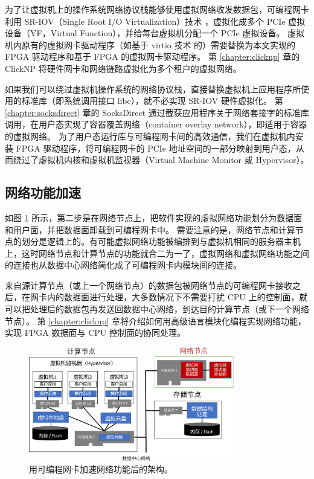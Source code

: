 为了让虚拟机上的操作系统网络协议栈能够使用虚拟网络收发数据包，可编程网卡利用 SR-IOV（Single Root I/O Virtualization）技术 \cite{dong2012high}，虚拟化成多个 PCIe 虚拟设备（VF，Virtual Function），并给每台虚拟机分配一个 PCIe 虚拟设备。
虚拟机内原有的虚拟网卡驱动程序（如基于 virtio 技术 \cite{russell2008virtio} 的）需要替换为本文实现的 FPGA 驱动程序和基于 FPGA 的虚拟网卡驱动程序。
第 \ref{chapter:clicknp} 章的 ClickNP 将硬件网卡和网络链路虚拟化为多个租户的虚拟网络。

如果我们可以绕过虚拟机操作系统的网络协议栈，直接替换虚拟机上应用程序所使用的标准库（即系统调用接口 libc），就不必实现 SR-IOV 硬件虚拟化。
第 \ref{chapter:socksdirect} 章的 SocksDirect 通过截获应用程序关于网络套接字的标准库调用，在用户态实现了容器覆盖网络（container overlay network），即适用于容器的虚拟网络。
为了用户态运行库与可编程网卡间的高效通信，我们在虚拟机内安装 FPGA 驱动程序，将可编程网卡的 PCIe 地址空间的一部分映射到用户态，从而绕过了虚拟机内核和虚拟机监视器（Virtual Machine Monitor 或 Hypervisor）。



\subsection{网络功能加速}

如图 \ref{arch:fig:network-function} 所示，第二步是在网络节点上，把软件实现的虚拟网络功能划分为数据面和用户面，并把数据面卸载到可编程网卡中。
需要注意的是，网络节点和计算节点的划分是逻辑上的。有可能虚拟网络功能被编排到与虚拟机相同的服务器主机上，这时网络节点和计算节点的功能就合二为一了，虚拟网络和虚拟网络功能之间的连接也从数据中心网络简化成了可编程网卡内模块间的连接。

来自源计算节点（或上一个网络节点）的数据包被网络节点的可编程网卡接收之后，在网卡内的数据面进行处理，大多数情况下不需要打扰 CPU 上的控制面，就可以把处理后的数据包再发送回数据中心网络，到达目的计算节点（或下一个网络节点）。
第 \ref{chapter:clicknp} 章将介绍如何用高级语言模块化编程实现网络功能，实现 FPGA 数据面与 CPU 控制面的协同处理。


\begin{figure}[htbp]
	\centering
	\includegraphics[width=0.8\textwidth]{figures/NFV_accel.pdf}
	\caption{用可编程网卡加速网络功能后的架构。}
	\label{arch:fig:network-function}
\end{figure}

